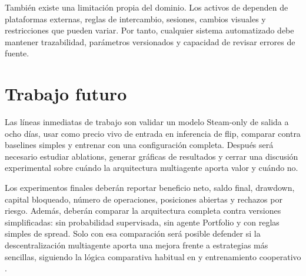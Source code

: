 También existe una limitación propia del dominio. Los activos de  dependen de plataformas externas, reglas de intercambio, sesiones, cambios visuales y restricciones que pueden variar. Por tanto, cualquier sistema automatizado debe mantener trazabilidad, parámetros versionados y capacidad de revisar errores de fuente.

\section{Trabajo futuro}

Las líneas inmediatas de trabajo son validar un modelo Steam-only de salida a ocho días, usar  como precio vivo de entrada en inferencia de flip, comparar contra baselines simples y entrenar  con una configuración  completa. Después será necesario estudiar ablations, generar gráficas de resultados y cerrar una discusión experimental sobre cuándo la arquitectura multiagente aporta valor y cuándo no.

Los experimentos finales deberán reportar beneficio neto, saldo final, drawdown, capital bloqueado, número de operaciones, posiciones abiertas y rechazos por riesgo. Además, deberán comparar la arquitectura completa contra versiones simplificadas: sin probabilidad supervisada, sin agente Portfolio y con reglas simples de spread. Solo con esa comparación será posible defender si la descentralización multiagente aporta una mejora frente a estrategias más sencillas, siguiendo la lógica comparativa habitual en  y entrenamiento cooperativo \cite{lowe2017maddpg,yu2022mappo}.
